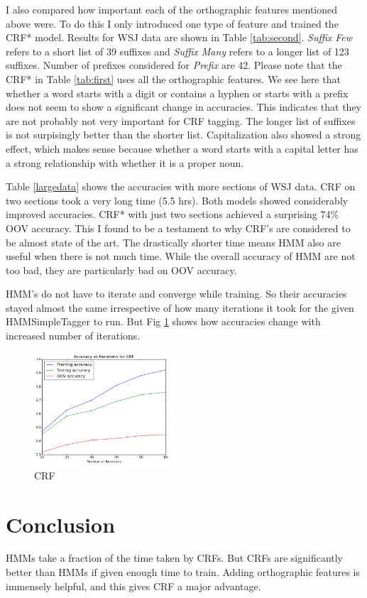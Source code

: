 \documentclass[twocolumn]{article}
\begin{document}
I also compared how important each of the orthographic features mentioned above were. To do this I only introduced one type of feature and trained the CRF* model. Results for WSJ data are shown in Table \ref{tab:second}. \textit{Suffix Few} refers to a short list of 39 suffixes and \textit{Suffix Many} refers to a longer list of 123 suffixes. Number of prefixes considered for \textit{Prefix} are 42. Please note that the CRF* in Table \ref{tab:first} uses all the orthographic features. We see here that whether a word starts with a digit or contains a hyphen or starts with a prefix does not seem to show a significant change in accuracies. This indicates that they are not probably not very important for CRF tagging. The longer list of suffixes is not surpisingly better than the shorter list. Capitalization also showed a strong effect, which makes sense because whether a word starts with a capital letter has a strong relationship with whether it is a proper noun.


Table \ref{largedata} shows the accuracies with more sections of WSJ data. CRF on two sections took a very long time (5.5 hrs). Both models showed considerably improved accuracies. CRF* with just two sections achieved  a surprising 74\% OOV accuracy. This I found to be a testament to why CRF's are considered to be almost state of the art. The drastically shorter time means HMM also are useful when there is not much time. While the overall accuracy of HMM are not too bad, they are particularly bad on OOV accuracy.


HMM's do not have to iterate and converge while training. So their accuracies stayed almost the same irrespective of how many iterations it took for the given HMMSimpleTagger to run. But Fig \ref{fig:crf} shows how accuracies change with increased number of iterations.
\begin{figure}
\begin{center}
    \includegraphics[width=0.45\textwidth]{crf_iters.png}
    \caption{CRF}
    \label{fig:crf}
    \end{center}
\end{figure}
\vspace{-3mm}
\section{Conclusion}
\vspace{-3mm}
HMMs take a fraction of the time taken by CRFs. But CRFs are significantly better than HMMs if given enough time to train. Adding orthographic features is immensely helpful, and this gives CRF a major advantage.
\end{document}
